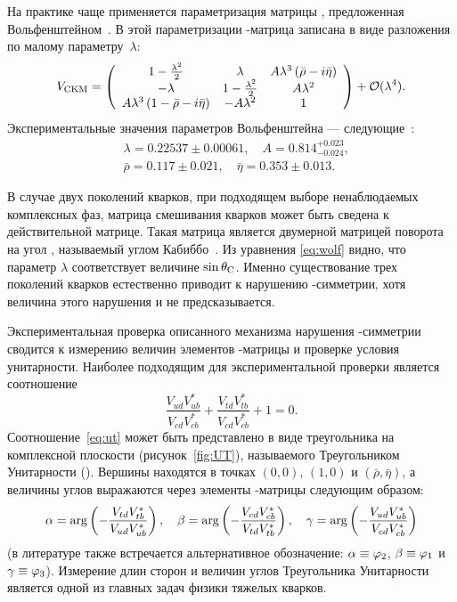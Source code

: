 На практике чаще применяется параметризация матрицы \ckm, предложенная Вольфенштейном~\cite{Wolfenstein}.  В этой параметризации \ckm-матрица записана в виде разложения по малому параметру~$\lambda$:
\begin{equation}\label{eq:wolf}
 V_{\mathrm{CKM}} = 
  \left(
  \begin{array}{ccc}
  1-\frac{\lambda^2}{2}               & \lambda               & A\lambda^3\left(\bar\rho-i\bar\eta\right) \\
  -\lambda                            & 1-\frac{\lambda^2}{2} & A\lambda^2                        \\
  A\lambda^3\left(1-\bar\rho-i\bar\eta\right) & -A\lambda^2           & 1 \\
  \end{array}
  \right)
  +\mathcal{O}(\lambda^4).
 \end{equation}
Экспериментальные значения параметров Вольфенштейна --- следующие~\cite{pdg}:
\begin{equation}\label{eq:wolf_param_values}
\begin{split}
 &\lambda = 0.22537\pm0.00061,\quad A = 0.814^{+0.023}_{-0.024},\\
 &\bar\rho = 0.117\pm0.021,\quad \bar\eta = 0.353\pm0.013.
\end{split}
\end{equation}

В случае двух поколений кварков, при подходящем выборе ненаблюдаемых комплексных фаз, матрица смешивания кварков может быть сведена к действительной матрице.  Такая матрица является двумерной матрицей поворота на угол \cabang, называемый углом Кабиббо~\cite{Cabibbo}.  Из уравнения \eqref{eq:wolf} видно, что параметр $\lambda$ соответствует величине $\sin\theta_{\mathrm{C}}$.  Именно существование трех поколений кварков естественно приводит к нарушению \cpconj-симметрии, хотя величина этого нарушения и не предсказывается.

Экспериментальная проверка описанного механизма нарушения \cpconj-симметрии сводится к измерению величин элементов \ckm-матрицы и проверке условия унитарности.  Наиболее подходящим для экспериментальной проверки является соотношение
\begin{equation}\label{eq:ut}
 \frac{V_{ud}V_{ub}^*}{V_{cd}V_{cb}^*}+\frac{V_{td}V_{tb}^*}{V_{cd}V_{cb}^*} + 1 = 0.
\end{equation}
Соотношение~\eqref{eq:ut} может быть представлено в виде треугольника на комплексной плоскости (рисунок~\ref{fig:UT}), называемого Треугольником Унитарности (\ut).  Вершины \ut находятся в точках $(0,0)$, $(1,0)$ и $(\bar\rho,\bar\eta)$, а величины углов выражаются через элементы \ckm-матрицы следующим образом:
\begin{equation}\label{eq:ut_angles}
 \alpha = \arg\left(-\frac{V_{td}V^*_{tb}}{V_{ud}V^*_{ub}}\right),\quad
 \beta = \arg\left(-\frac{V_{cd}V^*_{cb}}{V_{td}V^*_{tb}}\right),\quad
 \gamma = \arg\left(-\frac{V_{ud}V^*_{ub}}{V_{cd}V^*_{cb}}\right)
\end{equation}
(в литературе также встречается альтернативное обозначение: $\alpha\equiv\varphi_2$, $\beta\equiv\varphi_1$ и $\gamma\equiv\varphi_3$).  Измерение длин сторон и величин углов Треугольника Унитарности является одной из главных задач физики тяжелых кварков.


